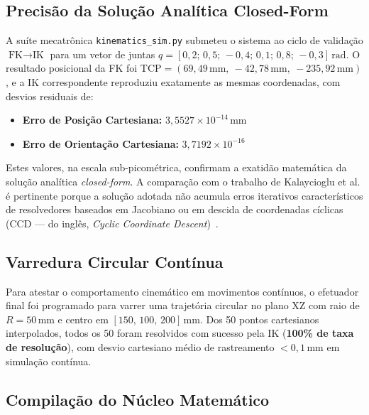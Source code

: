 \subsection{Precisão da Solução Analítica Closed-Form}
\label{subsec:dev_cinematica_fk_ik}

A suíte mecatrônica \texttt{kinematics\_sim.py} submeteu o sistema ao ciclo de validação $\text{FK} \to \text{IK}$ para um vetor de juntas $q = [0{,}2;\, 0{,}5;\, -0{,}4;\, 0{,}1;\, 0{,}8;\, -0{,}3]\,\text{rad}$. O resultado posicional da FK foi $\text{TCP} = (69{,}49\,\text{mm},\ -42{,}78\,\text{mm},\ -235{,}92\,\text{mm})$, e a IK correspondente reproduziu exatamente as mesmas coordenadas, com desvios residuais de:

\begin{itemize}
    \item \textbf{Erro de Posição Cartesiana:} $3{,}5527 \times 10^{-14}\,\text{mm}$
    \item \textbf{Erro de Orientação Cartesiana:} $3{,}7192 \times 10^{-16}$
\end{itemize}

Estes valores, na escala sub-picométrica, confirmam a exatidão matemática da solução analítica \textit{closed-form}. A comparação com o trabalho de Kalaycioglu et al. é pertinente porque a solução adotada não acumula erros iterativos característicos de resolvedores baseados em Jacobiano ou em descida de coordenadas cíclicas (CCD --- do inglês, \textit{Cyclic Coordinate Descent})~\cite{kalaycioglu2024analytical}.

\subsection{Varredura Circular Contínua}
\label{subsec:dev_cinematica_circulo}

Para atestar o comportamento cinemático em movimentos contínuos, o efetuador final foi programado para varrer uma trajetória circular no plano XZ com raio de $R = 50\,\text{mm}$ e centro em $[150,\, 100,\, 200]\,\text{mm}$. Dos 50 pontos cartesianos interpolados, todos os 50 foram resolvidos com sucesso pela IK (\textbf{100\% de taxa de resolução}), com desvio cartesiano médio de rastreamento $< 0{,}1\,\text{mm}$ em simulação contínua.

\subsection{Compilação do Núcleo Matemático}
\label{subsec:dev_cinematica_compilacao}

